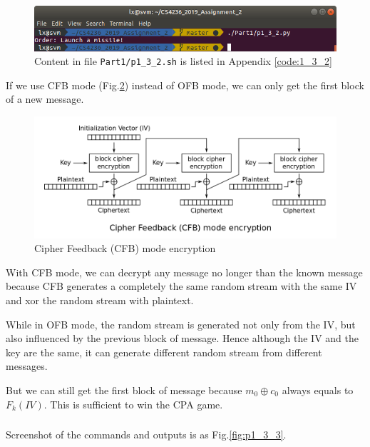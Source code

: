 \begin{figure}[t!]
\centering
\includegraphics[width=\columnwidth]{pictures/p1_3_2.png}
\caption{
    Content in file \texttt{Part1/p1\_3\_2.sh} is listed in Appendix \ref{code:1_3_2}
}
\label{fig:p1_3_2}
\end{figure}

If we use CFB mode (Fig.\ref{fig:CFB_encryption}) instead of OFB mode, we can only get the first block of a new message.

\begin{figure}[ht]
\centering
\includegraphics[width=\columnwidth]{pictures/CFB_encryption.png}
\caption{
    Cipher Feedback (CFB) mode encryption
}
\label{fig:CFB_encryption}
\end{figure}



With CFB mode, we can decrypt any message no longer than the known message because CFB generates a completely the same random stream with the same IV and xor the random stream with plaintext.

While in OFB mode, the random stream is generated not only from the IV, but also influenced by the previous block of message. Hence although the IV and the key are the same, it can generate different random stream from different messages.

But we can still get the first block of message because $m_0 \oplus c_0$ always equals to $F_k(IV)$. This is sufficient to win the CPA game.

\subsubsection{}

Screenshot of the commands and outputs is as Fig.\ref{fig:p1_3_3}.

